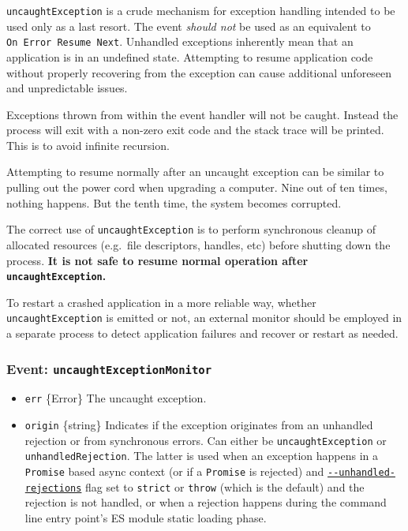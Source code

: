 \texttt{\textquotesingle{}uncaughtException\textquotesingle{}} is a
crude mechanism for exception handling intended to be used only as a
last resort. The event \emph{should not} be used as an equivalent to
\texttt{On\ Error\ Resume\ Next}. Unhandled exceptions inherently mean
that an application is in an undefined state. Attempting to resume
application code without properly recovering from the exception can
cause additional unforeseen and unpredictable issues.

Exceptions thrown from within the event handler will not be caught.
Instead the process will exit with a non-zero exit code and the stack
trace will be printed. This is to avoid infinite recursion.

Attempting to resume normally after an uncaught exception can be similar
to pulling out the power cord when upgrading a computer. Nine out of ten
times, nothing happens. But the tenth time, the system becomes
corrupted.

The correct use of
\texttt{\textquotesingle{}uncaughtException\textquotesingle{}} is to
perform synchronous cleanup of allocated resources (e.g.~file
descriptors, handles, etc) before shutting down the process. \textbf{It
is not safe to resume normal operation after
\texttt{\textquotesingle{}uncaughtException\textquotesingle{}}.}

To restart a crashed application in a more reliable way, whether
\texttt{\textquotesingle{}uncaughtException\textquotesingle{}} is
emitted or not, an external monitor should be employed in a separate
process to detect application failures and recover or restart as needed.

\subsubsection{\texorpdfstring{Event:
\texttt{\textquotesingle{}uncaughtExceptionMonitor\textquotesingle{}}}{Event: \textquotesingle uncaughtExceptionMonitor\textquotesingle{}}}\label{event-uncaughtexceptionmonitor}

\begin{itemize}
\tightlist
\item
  \texttt{err} \{Error\} The uncaught exception.
\item
  \texttt{origin} \{string\} Indicates if the exception originates from
  an unhandled rejection or from synchronous errors. Can either be
  \texttt{\textquotesingle{}uncaughtException\textquotesingle{}} or
  \texttt{\textquotesingle{}unhandledRejection\textquotesingle{}}. The
  latter is used when an exception happens in a \texttt{Promise} based
  async context (or if a \texttt{Promise} is rejected) and
  \href{cli.md\#--unhandled-rejectionsmode}{\texttt{-\/-unhandled-rejections}}
  flag set to \texttt{strict} or \texttt{throw} (which is the default)
  and the rejection is not handled, or when a rejection happens during
  the command line entry point's ES module static loading phase.
\end{itemize}

